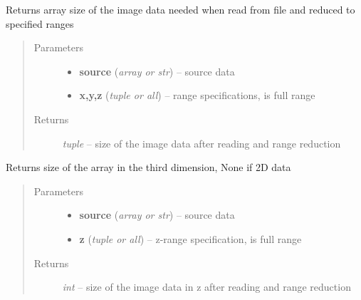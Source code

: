\documentclass[letterpaper,10pt,english]{sphinxmanual}
\begin{document}
\begin{fulllineitems}
\label{api/ClearMap.IO:ClearMap.IO.IO.dataSize}
Returns array size of the image data needed when read from file and reduced to specified ranges
\begin{quote}\begin{description}
\item[{Parameters}] \leavevmode\begin{itemize}
\item {} 
\textbf{source} (\emph{array or str}) --
source data

\item {} 
\textbf{x,y,z} (\emph{tuple or all}) --
range specifications,  is full range

\end{itemize}

\item[{Returns}] \leavevmode
\emph{tuple} --
size of the image data after reading and range reduction

\end{description}\end{quote}

\end{fulllineitems}


\begin{fulllineitems}
\label{api/ClearMap.IO:ClearMap.IO.IO.dataZSize}
Returns size of the array in the third dimension, None if 2D data
\begin{quote}\begin{description}
\item[{Parameters}] \leavevmode\begin{itemize}
\item {} 
\textbf{source} (\emph{array or str}) --
source data

\item {} 
\textbf{z} (\emph{tuple or all}) --
z-range specification,  is full range

\end{itemize}

\item[{Returns}] \leavevmode
\emph{int} --
size of the image data in z after reading and range reduction

\end{description}\end{quote}

\end{fulllineitems}
\end{document}
